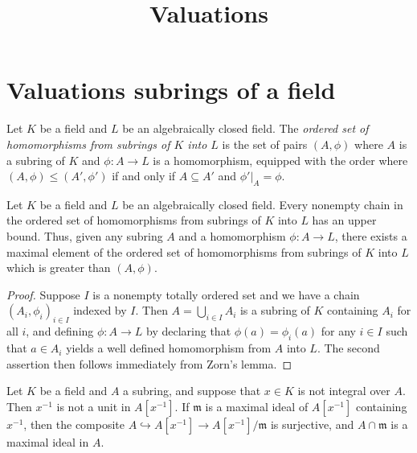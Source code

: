 

\title{Valuations}


\maketitle

\label{section-phantom}
\tableofcontents


\section{Valuations subrings of a field}

\begin{definition}
	Let $K$ be a field and $L$ be an algebraically closed field. The \emph{ordered set of homomorphisms from subrings of $K$ into $L$} is the set of pairs $(A, \phi)$ where $A$ is a subring of $K$ and $\phi : A \to L$ is a homomorphism, equipped with the order where $(A, \phi) \leq (A', \phi')$ if and only if $A \subseteq A'$ and $\phi'|_A = \phi$. 
\end{definition}

\begin{lemma}
\label{result:ordered-set-of-maps-maximal}
Let $K$ be a field and $L$ be an algebraically closed field. Every nonempty chain in the ordered set of homomorphisms from subrings of $K$ into $L$ has an upper bound. Thus, given any subring $A$ and a homomorphism $\phi : A \to L$, there exists a maximal element of the ordered set of homomorphisms from subrings of $K$ into $L$ which is greater than $(A, \phi)$. 
\end{lemma}

\begin{proof}
Suppose $I$ is a nonempty totally ordered set and we have a chain $(A_i, \phi_i)_{i \in I}$ indexed by $I$. Then $A = \bigcup_{i \in I} A_i$ is a subring of $K$ containing $A_i$ for all $i$, and defining $\phi : A \to L$ by declaring that $\phi(a) = \phi_i(a)$ for any $i \in I$ such that $a \in A_i$ yields a well defined homomorphism from $A$ into $L$. The second assertion then follows immediately from Zorn's lemma. 
\end{proof}

\begin{lemma}
\label{result:not-integral-implies-not-unit}
Let $K$ be a field and $A$ a subring, and suppose that $x \in K$ is not integral over $A$. Then $x^{-1}$ is not a unit in $A[x^{-1}]$. If $\mathfrak{m}$ is a maximal ideal of $A[x^{-1}]$ containing $x^{-1}$, then the composite $A \hookrightarrow A[x^{-1}] \to A[x^{-1}]/\mathfrak{m}$ is surjective, and $A \cap \mathfrak{m}$ is a maximal ideal in $A$. 
\end{lemma}

